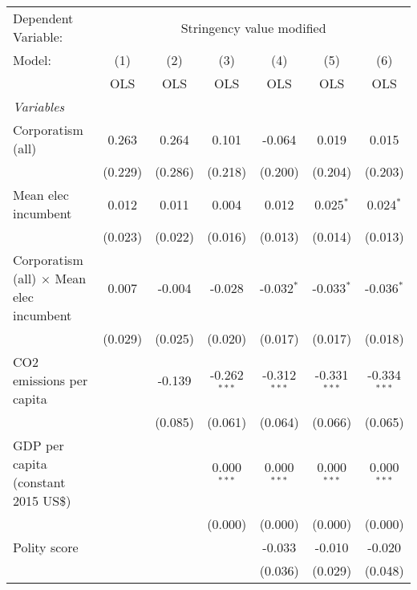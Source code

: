 
\begingroup
\centering
\begin{tabular}{lcccccc}
   \toprule
   Dependent Variable: & \multicolumn{6}{c}{Stringency value modified}\\
   Model:                                          & (1)     & (2)     & (3)            & (4)            & (5)            & (6)\\  
                                                   &  OLS    & OLS     & OLS            & OLS            & OLS            & OLS\\  
   \midrule
   \emph{Variables}\\
   Corporatism (all)                               & 0.263   & 0.264   & 0.101          & -0.064         & 0.019          & 0.015\\   
                                                   & (0.229) & (0.286) & (0.218)        & (0.200)        & (0.204)        & (0.203)\\   
   Mean elec incumbent                             & 0.012   & 0.011   & 0.004          & 0.012          & 0.025$^{*}$    & 0.024$^{*}$\\   
                                                   & (0.023) & (0.022) & (0.016)        & (0.013)        & (0.014)        & (0.013)\\   
   Corporatism (all) $\times$ Mean elec incumbent  & 0.007   & -0.004  & -0.028         & -0.032$^{*}$   & -0.033$^{*}$   & -0.036$^{*}$\\   
                                                   & (0.029) & (0.025) & (0.020)        & (0.017)        & (0.017)        & (0.018)\\   
   CO2 emissions per capita                        &         & -0.139  & -0.262$^{***}$ & -0.312$^{***}$ & -0.331$^{***}$ & -0.334$^{***}$\\   
                                                   &         & (0.085) & (0.061)        & (0.064)        & (0.066)        & (0.065)\\   
   GDP per capita (constant 2015 US\$)             &         &         & 0.000$^{***}$  & 0.000$^{***}$  & 0.000$^{***}$  & 0.000$^{***}$\\   
                                                   &         &         & (0.000)        & (0.000)        & (0.000)        & (0.000)\\   
   Polity score                                    &         &         &                & -0.033         & -0.010         & -0.020\\   
                                                   &         &         &                & (0.036)        & (0.029)        & (0.048)\\   

\end{tabular}
